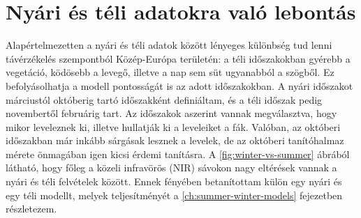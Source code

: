 \section{Nyári és téli adatokra való lebontás}

Alapértelmezetten a nyári és téli adatok között lényeges különbség tud lenni távérzékelés szempontból Közép-Európa területén: a téli időszakokban gyérebb a vegetáció, ködösebb a levegő, illetve a nap sem süt ugyanabból a szögből. Ez befolyásolhatja a modell pontosságát is az adott időszakokban. A nyári időszakot márciustól októberig tartó időszakként definiáltam, és a téli időszak pedig novembertől februárig tart. Az időszakok aszerint vannak megválasztva, hogy mikor leveleznek ki, illetve hullatják ki a leveleiket a fák. Valóban, az októberi időszakban már inkább sárgásak lesznek a levelek, de az októberi tanítóhalmaz mérete önmagában igen kicsi érdemi tanításra. A \ref{fig:winter-vs-summer} ábrából látható, hogy főleg a közeli infravörös (NIR) sávokon nagy eltérések vannak a nyári és téli felvételek között. Ennek fényében betanítottam külön egy nyári és egy téli modellt, melyek teljesítményét a \ref{ch:summer-winter-models}  fejezetben részletezem.

